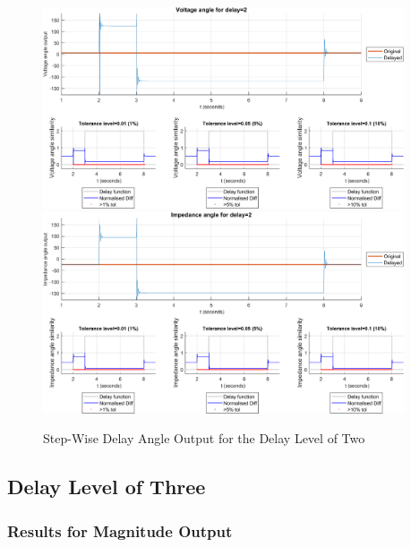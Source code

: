 \begin{figure}
    \caption{Step-Wise Delay Angle Output for the Delay Level of Two}
    \includegraphics[width=0.95\textwidth]{PMUsim-figures/DelayOf_2/Step_vAngle.png}    
    \includegraphics[width=0.95\textwidth]{PMUsim-figures/DelayOf_2/Step_iAngle.png}    
    \label{fig:PMUsimStep_Two_Angle}
        \begin{small}
     \end{small}
\end{figure}


\newpage \subsection{Delay Level of Three}
\subsubsection{Results for Magnitude Output}


